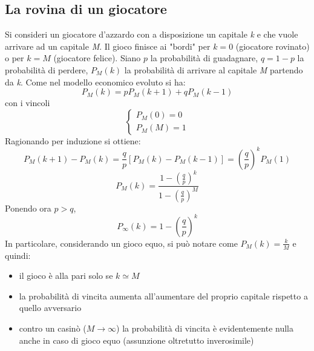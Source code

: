 \documentclass[12pt, a4paper]{article}
\theoremstyle{theorem}
\begin{document}
		\subsection{La rovina di un giocatore}
			Si consideri un giocatore d'azzardo con a disposizione un capitale \textit{k} e che vuole arrivare ad un capitale \textit{M}.
			Il gioco finisce ai "bordi" per $k=0$ (giocatore rovinato) o per $k=M$ (giocatore felice).
			Siano $p$ la probabilità di guadagnare, $q=1-p$ la probabilità di perdere, $P_M(k)$ la probabilità di arrivare al capitale \textit{M} partendo da \textit{k}.
			Come nel modello economico evoluto si ha:
			\begin{equation}
				P_M(k)=pP_M(k+1)+qP_M(k-1)
			\end{equation}
			con i vincoli
			\begin{equation}
				\begin{cases}
					P_M(0)=0\\
					P_M(M)=1
				\end{cases}
			\end{equation}
			Ragionando per induzione si ottiene:
			\begin{equation}
				P_M(k+1)-P_M(k)=\frac{q}{p}\left[P_M(k)-P_M(k-1)\right]=\left(\frac{q}{p}\right)^kP_M(1)
			\end{equation}
			\begin{equation}
				P_M(k)=\frac{1-\left(\frac{q}{p}\right)^k}{1-\left(\frac{q}{p}\right)^M}
			\end{equation}
			Ponendo ora $p>q$,
			\begin{equation}
				P_\infty(k)=1-\left(\frac{q}{p}\right)^k
			\end{equation}
			In particolare, considerando un gioco equo, si può notare come $P_M(k)=\frac{k}{M}$ e quindi:
			\begin{itemize}
				\item il gioco è alla pari solo se $k\simeq M$
				\item la probabilità di vincita aumenta all'aumentare del proprio capitale rispetto a quello avversario
				\item contro un casinò ($M\to\infty$) la probabilità di vincita è evidentemente nulla anche in caso di gioco equo (assunzione oltretutto inverosimile)
			\end{itemize}
\end{document}
